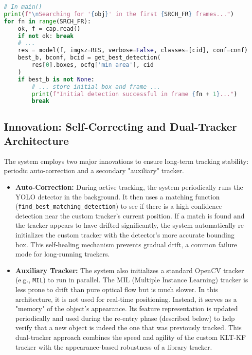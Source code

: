 \documentclass[12pt, a4paper]{article}
\begin{document}
\begin{lstlisting}[language=Python, caption={Robust initial target acquisition loop.}, label={lst:init_search}]
# In main()
print(f"\nSearching for '{obj}' in the first {SRCH_FR} frames...")
for fn in range(SRCH_FR):
    ok, f = cap.read()
    if not ok: break
    # ...
    res = model(f, imgsz=RES, verbose=False, classes=[cid], conf=conf)
    best_b, bconf, bcid = get_best_detection(
        res[0].boxes, ocfg['min_area'], cid
    )
    if best_b is not None:
        # ... store initial box and frame ...
        print(f"Initial detection successful in frame {fn + 1}...")
        break
\end{lstlisting}

\subsection{Innovation: Self-Correcting and Dual-Tracker Architecture}
The system employs two major innovations to ensure long-term tracking stability: periodic auto-correction and a secondary "auxiliary" tracker.

\begin{itemize}
    \item \textbf{Auto-Correction:} During active tracking, the system periodically runs the YOLO detector in the background. It then uses a matching function (\lstinline!find_best_matching_detection!) to see if there is a high-confidence detection near the custom tracker's current position. If a match is found and the tracker appears to have drifted significantly, the system automatically re-initializes the custom tracker with the detector's more accurate bounding box. This self-healing mechanism prevents gradual drift, a common failure mode for long-running trackers.
    
    \item \textbf{Auxiliary Tracker:} The system also initializes a standard OpenCV tracker (e.g., \texttt{MIL}) to run in parallel. The MIL (Multiple Instance Learning) tracker is less prone to drift than pure optical flow but is much slower. In this architecture, it is not used for real-time positioning. Instead, it serves as a "memory" of the object's appearance. Its feature representation is updated periodically and used during the re-entry phase (described below) to help verify that a new object is indeed the one that was previously tracked. This dual-tracker approach combines the speed and agility of the custom KLT-KF tracker with the appearance-based robustness of a library tracker.
\end{itemize}
\end{document}
